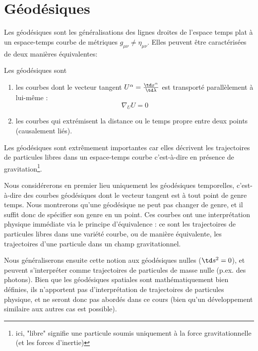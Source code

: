 \chapter{Géodésiques}

Les géodésiques sont les généralisations des lignes droites de l'espace temps plat à un espace-temps courbe de métriques $g_{\mu \nu} \neq \eta_{\mu \nu}$. Elles peuvent être caractérisées de deux manières équivalentes:

\begin{theoremframe}
    \begin{defi}
    \label{def:géodésiques1}
    Les géodésiques sont
        \begin{enumerate}
            \item les courbes dont le vecteur tangent $U^\alpha = \frac{\td x^\alpha}{\td \lambda}$ est transporté parallèlement à lui-même :
            \begin{equation}
                \nabla_U U =0
            \end{equation}
            \item les courbes qui extrémisent la distance ou le temps propre entre deux points (causalement liés). 
        \end{enumerate}
    \end{defi}
\end{theoremframe}
Les géodésiques sont extrêmement importantes car elles décrivent les trajectoires de particules libres dans un espace-temps courbe c'est-à-dire en présence de gravitation\footnote{ici, "libre" signifie une particule soumis uniquement à la force gravitationnelle (et les forces d'inertie)}.

Nous considérerons en premier lieu uniquement les géodésiques temporelles, c'est-à-dire des courbes géodésiques dont le vecteur tangent est à tout point de genre temps. Nous montrerons qu'une géodésique ne peut pas changer de genre, et il suffit donc de spécifier son genre en un point. Ces courbes ont une interprétation physique immédiate via le principe d'équivalence : ce sont les trajectoires de particules libres dans une variété courbe, ou de manière équivalente, les trajectoires d'une particule dans un champ gravitationnel.

Nous généraliserons ensuite cette notion aux géodésiques nulles ($\td s^2 = 0$), et peuvent s'interpréter comme trajectoires de particules de masse nulle (p.ex. des photons). Bien que les géodésiques spatiales sont mathématiquement bien définies, ils n'apportent pas d'interprétation de trajectoires de particules physique, et ne seront donc pas abordés dans ce cours (bien qu'un développement similaire aux autres cas est possible).

